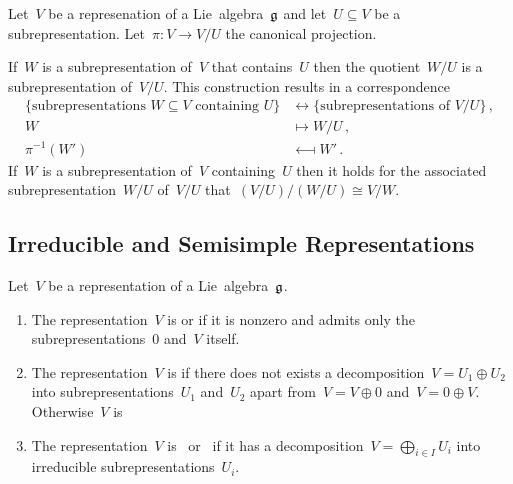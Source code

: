 \begin{proposition}
  \label{correspondence theorem!for representations}
  Let~$V$ be a represenation of a Lie~algebra~$\mathfrak{g}$ and let~$U \subseteq V$ be a subrepresentation.
  Let~$\pi \colon V \to V/U$ the canonical projection.
  
  If~$W$ is a subrepresentation of~$V$ that contains~$U$ then the quotient~$W/U$ is a subrepresentation of~$V/U$.
  This construction results in a {\onetoone} correspondence
  \begin{align*}
    \{ \text{subrepresentations~$W \subseteq V$ containing~$U$} \}
    &\longleftrightarrow
    \{ \text{subrepresentations of~$V/U$} \}  \,,
    \\
    W
    &\longmapsto
    W/U \,,
    \\
    \pi^{-1}(W')
    &\longmapsfrom
    W'  \,.
  \end{align*}
  If~$W$ is a subrepresentation of~$V$ containing~$U$ then it holds for the associated subrepresentation~$W/U$ of~$V/U$ that~$(V/U)/(W/U) \cong V/W$.
\end{proposition}





\subsection{Irreducible and Semisimple Representations}


\begin{definition}
  Let~$V$ be a representation of a Lie~algebra~$\mathfrak{g}$.
  \begin{enumerate}
    \item
      The representation~$V$ is  or  if it is nonzero and admits only the subrepresentations~$0$ and~$V$ itself.
    \item
      The representation~$V$ is  if there does not exists a decomposition~$V = U_1 \oplus U_2$ into subrepresentations~$U_1$ and~$U_2$ apart from~$V = V \oplus 0$ and~$V = 0 \oplus V$.
      Otherwise~$V$ is 
    \item
      The representation~$V$ is~ or~ if it has a decomposition~$V = \bigoplus_{i \in I} U_i$ into irreducible subrepresentations~$U_i$.
  \end{enumerate}
\end{definition}


